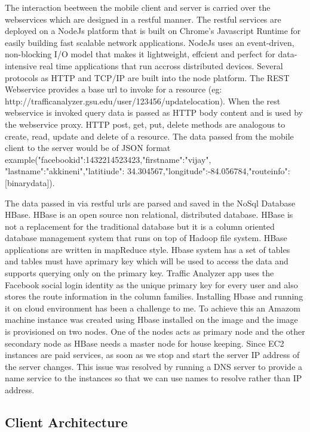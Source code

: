 \documentclass[10pt]{sigplan-proc-varsize}
\begin{document}
 The interaction beetween the mobile client and server is carried over the webservices which are designed in a restful manner.  The restful services are deployed on a NodeJs platform that is built on Chrome's Javascript Runtime for easily building fast scalable network applications. NodeJs uses an event-driven, non-blocking I/O model that makes it lightweight, effcient and perfect for data-intensive real time applications that run accross distributed devices. Several protocols as HTTP and TCP/IP are built into the node platform. The REST Webservice provides a base url to invoke for a resource (eg: http://trafficanalyzer.gsu.edu/user/123456/updatelocation). When the rest webservice is invoked query data is passed as HTTP body content and is used by the webservice proxy. HTTP post, get, put, delete methods are analogous to create, read, update and delete of a resource. The data passed from the mobile client to the server would be of JSON format example({"facebookid":1432214523423,"firstname":"vijay",
"lastname":"akkineni","latitiude": 34.304567,"longitude":-84.056784,"routeinfo":[binarydata]}).
 
The data passed in via restful urls are parsed and saved in the NoSql Database HBase.  HBase is an open source non relational, distributed database. HBase is not a replacement for the traditional database but it is a column oriented database management system that runs on top of Hadoop file system. HBase applications are written in mapReduce style. Hbase system has a set of tables and tables must have aprimary key which will be used to access the data and supports querying only on the primary key.  Traffic Analyzer app uses the Facebook social login identity as the unique primary key for every user and also stores the route information in the column families. Installing Hbase and running it on cloud environment has been a challenge to me. To achieve this an Amazom machine instance was created using Hbase installed on the image and the image is provisioned on two nodes. One of the nodes acts as primary node and the other secondary node as HBase needs a master node for house keeping. Since EC2 instances are paid services, as soon as we stop and start the server IP address of the server changes. This issue was resolved by running a DNS server to provide a name service to the instances so that we can use names to resolve rather than IP address. 

\subsection{Client Architecture}
\end{document}
